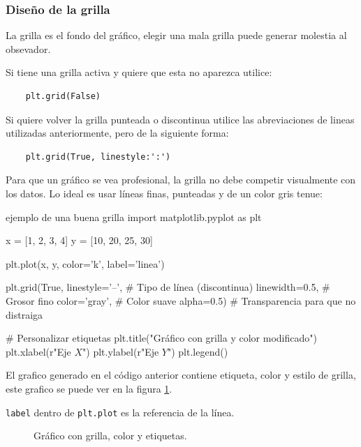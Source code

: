 \subsubsection{Diseño de la grilla}

La grilla es el fondo del gráfico, elegir una mala grilla puede generar molestia al obsevador.

Si tiene una grilla activa y quiere que esta no aparezca utilice:
\begin{verbatim}
    plt.grid(False)
\end{verbatim}

Si quiere volver la grilla punteada o discontinua utilice las abreviaciones de lineas utilizadas anteriormente, pero de la siguiente forma:
\begin{verbatim}
    plt.grid(True, linestyle:':')
\end{verbatim}

Para que un gráfico se vea profesional, la grilla no debe competir visualmente con los datos. Lo ideal es usar líneas finas, punteadas y de un color gris tenue:
\begin{pycode}{ejemplo de una buena grilla}
import matplotlib.pyplot as plt

x = [1, 2, 3, 4]
y = [10, 20, 25, 30]

plt.plot(x, y, color='k', label='linea')

plt.grid(True, 
         linestyle='--',   # Tipo de línea (discontinua)
         linewidth=0.5,    # Grosor fino
         color='gray',     # Color suave
         alpha=0.5)        # Transparencia para que no distraiga

# Personalizar etiquetas
plt.title("Gráfico con grilla y color modificado")
plt.xlabel(r"Eje $X$")
plt.ylabel(r"Eje $Y$")
plt.legend()
\end{pycode}

El grafico generado en el código anterior contiene etiqueta, color y estilo de grilla, este grafico se puede ver en la figura \ref{fig:grafico_simple_grilla}. 

\begin{nota}
    \texttt{label} dentro de \texttt{plt.plot} es la referencia de la línea.
\end{nota}

\begin{figure}[ht]
    \centering
     
    \caption{Gráfico con grilla, color y etiquetas.}
    \label{fig:grafico_simple_grilla}
\end{figure}




